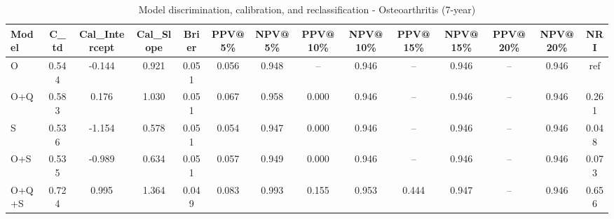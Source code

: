 \begin{table}[htbp]
\centering
\small
\caption{Model discrimination, calibration, and reclassification - Osteoarthritis (7-year)}
\label{tab:perf_osteoarthritis_7y}
\begin{tabular}{lccccccccccccc}
\toprule
Model & C\_td & Cal\_Intercept & Cal\_Slope & Brier & PPV@5\% & NPV@5\% & PPV@10\% & NPV@10\% & PPV@15\% & NPV@15\% & PPV@20\% & NPV@20\% & NRI \\
\midrule
O & 0.544 & -0.144 & 0.921 & 0.051 & 0.056 & 0.948 & -- & 0.946 & -- & 0.946 & -- & 0.946 & ref \\
O+Q & 0.583 & 0.176 & 1.030 & 0.051 & 0.067 & 0.958 & 0.000 & 0.946 & -- & 0.946 & -- & 0.946 & 0.261 \\
S & 0.536 & -1.154 & 0.578 & 0.051 & 0.054 & 0.947 & 0.000 & 0.946 & -- & 0.946 & -- & 0.946 & 0.048 \\
O+S & 0.535 & -0.989 & 0.634 & 0.051 & 0.057 & 0.949 & 0.000 & 0.946 & -- & 0.946 & -- & 0.946 & 0.073 \\
O+Q+S & 0.724 & 0.995 & 1.364 & 0.049 & 0.083 & 0.993 & 0.155 & 0.953 & 0.444 & 0.947 & -- & 0.946 & 0.656 \\
\bottomrule
\end{tabular}
\end{table}